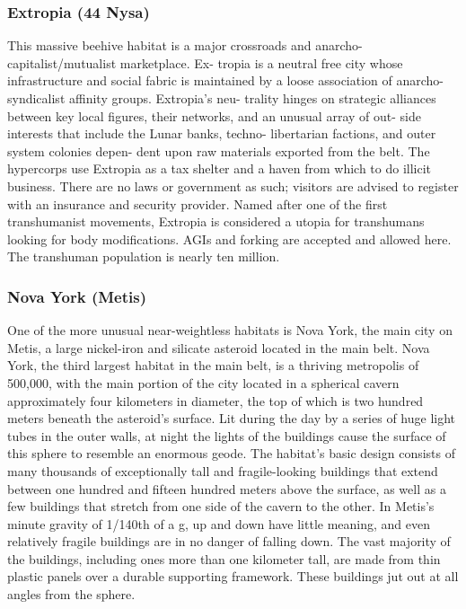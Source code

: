 \subsubsection{Extropia (44 Nysa)}

This massive beehive habitat is a major crossroads 
and anarcho-capitalist/mutualist marketplace. Ex-
tropia is a neutral free city whose infrastructure and 
social fabric is maintained by a loose association of 
anarcho-syndicalist affinity groups. Extropia's neu-
trality hinges on strategic alliances between key local 
figures, their networks, and an unusual array of out-
side interests that include the Lunar banks, techno-
libertarian factions, and outer system colonies depen-
dent upon raw materials exported from the belt. The 
hypercorps use Extropia as a tax shelter and a haven 
from which to do illicit business. There are no laws 
or government as such; visitors are advised to register 
with an insurance and security provider. Named after 
one of the first transhumanist movements, Extropia 
is considered a utopia for transhumans looking for 
body modifications. AGIs and forking are accepted 
and allowed here. The transhuman population is 
nearly ten million.

\subsubsection{Nova York (Metis)}

One of the more unusual near-weightless habitats is 
Nova York, the main city on Metis, a large nickel-iron 
and silicate asteroid located in the main belt. Nova 
York, the third largest habitat in the main belt, is a 
thriving metropolis of 500,000, with the main portion 
of the city located in a spherical cavern approximately 
four kilometers in diameter, the top of which is two 
hundred meters beneath the asteroid's surface. Lit 
during the day by a series of huge light tubes in the 
outer walls, at night the lights of the buildings cause 
the surface of this sphere to resemble an enormous 
geode. The habitat's basic design consists of many 
thousands of exceptionally tall and fragile-looking 
buildings that extend between one hundred and fifteen 
hundred meters above the surface, as well as a few 
buildings that stretch from one side of the cavern to 
the other. In Metis's minute gravity of 1/140th of a g, 
up and down have little meaning, and even relatively 
fragile buildings are in no danger of falling down. The 
vast majority of the buildings, including ones more 
than one kilometer tall, are made from thin plastic 
panels over a durable supporting framework. These 
buildings jut out at all angles from the sphere.

